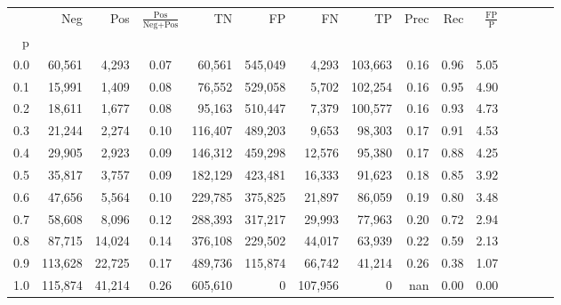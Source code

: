 \begin{tabular}{rrrcrrrrrrrrrrr}
\toprule
{} &      Neg &     Pos & $\frac{\text{Pos}}{\text{Neg}+\text{Pos}}$ &       TN &       FP &       FN &       TP &  Prec &   Rec & $\frac{\text{FP}}{\text{P}}$ \\
p   &          &         &                                            &          &          &          &          &       &       &                              \\
\midrule
0.0 &   60,561 &   4,293 &                                       0.07 &   60,561 &  545,049 &    4,293 &  103,663 &  0.16 &  0.96 &                         5.05 \\
0.1 &   15,991 &   1,409 &                                       0.08 &   76,552 &  529,058 &    5,702 &  102,254 &  0.16 &  0.95 &                         4.90 \\
0.2 &   18,611 &   1,677 &                                       0.08 &   95,163 &  510,447 &    7,379 &  100,577 &  0.16 &  0.93 &                         4.73 \\
0.3 &   21,244 &   2,274 &                                       0.10 &  116,407 &  489,203 &    9,653 &   98,303 &  0.17 &  0.91 &                         4.53 \\
0.4 &   29,905 &   2,923 &                                       0.09 &  146,312 &  459,298 &   12,576 &   95,380 &  0.17 &  0.88 &                         4.25 \\
0.5 &   35,817 &   3,757 &                                       0.09 &  182,129 &  423,481 &   16,333 &   91,623 &  0.18 &  0.85 &                         3.92 \\
0.6 &   47,656 &   5,564 &                                       0.10 &  229,785 &  375,825 &   21,897 &   86,059 &  0.19 &  0.80 &                         3.48 \\
0.7 &   58,608 &   8,096 &                                       0.12 &  288,393 &  317,217 &   29,993 &   77,963 &  0.20 &  0.72 &                         2.94 \\
0.8 &   87,715 &  14,024 &                                       0.14 &  376,108 &  229,502 &   44,017 &   63,939 &  0.22 &  0.59 &                         2.13 \\
0.9 &  113,628 &  22,725 &                                       0.17 &  489,736 &  115,874 &   66,742 &   41,214 &  0.26 &  0.38 &                         1.07 \\
1.0 &  115,874 &  41,214 &                                       0.26 &  605,610 &        0 &  107,956 &        0 &   nan &  0.00 &                         0.00 \\
\bottomrule
\end{tabular}
